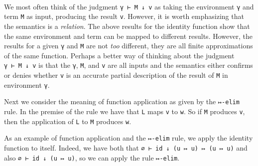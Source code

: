 \begin{fence}
\begin{code}%
\>[0]\AgdaSpace{}%
\AgdaSymbol{:}\AgdaSpace{}%
\AgdaSpace{}%
\AgdaSpace{}%
\AgdaSpace{}%
\AgdaSpace{}%
\AgdaSymbol{(}\AgdaSpace{}%
\AgdaSpace{}%
\AgdaSymbol{)}\AgdaSpace{}%
\AgdaSpace{}%
\AgdaSymbol{(}\AgdaSpace{}%
\AgdaSpace{}%
\AgdaSymbol{)}\AgdaSpace{}%
\AgdaSpace{}%
\AgdaSymbol{(}\AgdaSpace{}%
\AgdaSpace{}%
\AgdaSymbol{)}\<%
\\
\>[0]\AgdaSpace{}%
\AgdaSymbol{=}\AgdaSpace{}%
\AgdaSpace{}%
\AgdaSpace{}%
\<%
\end{code}
\end{fence}

We most often think of the judgment \texttt{γ\ ⊢\ M\ ↓\ v} as taking the
environment \texttt{γ} and term \texttt{M} as input, producing the
result \texttt{v}. However, it is worth emphasizing that the semantics
is a \emph{relation}. The above results for the identity function show
that the same environment and term can be mapped to different results.
However, the results for a given \texttt{γ} and \texttt{M} are not
\emph{too} different, they are all finite approximations of the same
function. Perhaps a better way of thinking about the judgment
\texttt{γ\ ⊢\ M\ ↓\ v} is that the \texttt{γ}, \texttt{M}, and
\texttt{v} are all inputs and the semantics either confirms or denies
whether \texttt{v} is an accurate partial description of the result of
\texttt{M} in environment \texttt{γ}.

Next we consider the meaning of function application as given by the
\texttt{↦-elim} rule. In the premise of the rule we have that \texttt{L}
maps \texttt{v} to \texttt{w}. So if \texttt{M} produces \texttt{v},
then the application of \texttt{L} to \texttt{M} produces \texttt{w}.

As an example of function application and the \texttt{↦-elim} rule, we
apply the identity function to itself. Indeed, we have both that
\texttt{∅\ ⊢\ id\ ↓\ (u\ ↦\ u)\ ↦\ (u\ ↦\ u)} and also
\texttt{∅\ ⊢\ id\ ↓\ (u\ ↦\ u)}, so we can apply the rule
\texttt{↦-elim}.

